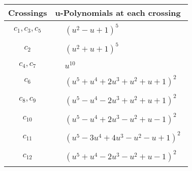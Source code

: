 \documentclass[1p]{elsarticle_modified}
\theoremstyle{definition}
\begin{document}
\begin{tabular}{m{50pt}|m{274pt}}
Crossings & \hspace{64pt}u-Polynomials at each crossing \\
\hline $$\begin{aligned}c_{1},c_{3},c_{5}\end{aligned}$$&$\begin{aligned}
&(u^2- u+1)^5
\end{aligned}$\\
\hline $$\begin{aligned}c_{2}\end{aligned}$$&$\begin{aligned}
&(u^2+u+1)^5
\end{aligned}$\\
\hline $$\begin{aligned}c_{4},c_{7}\end{aligned}$$&$\begin{aligned}
&u^{10}
\end{aligned}$\\
\hline $$\begin{aligned}c_{6}\end{aligned}$$&$\begin{aligned}
&(u^5+u^4+2 u^3+u^2+u+1)^2
\end{aligned}$\\
\hline $$\begin{aligned}c_{8},c_{9}\end{aligned}$$&$\begin{aligned}
&(u^5- u^4-2 u^3+u^2+u+1)^2
\end{aligned}$\\
\hline $$\begin{aligned}c_{10}\end{aligned}$$&$\begin{aligned}
&(u^5- u^4+2 u^3- u^2+u-1)^2
\end{aligned}$\\
\hline $$\begin{aligned}c_{11}\end{aligned}$$&$\begin{aligned}
&(u^5-3 u^4+4 u^3- u^2- u+1)^2
\end{aligned}$\\
\hline $$\begin{aligned}c_{12}\end{aligned}$$&$\begin{aligned}
&(u^5+u^4-2 u^3- u^2+u-1)^2
\end{aligned}$\\
\hline
\end{tabular}\\~\\
\end{document}
